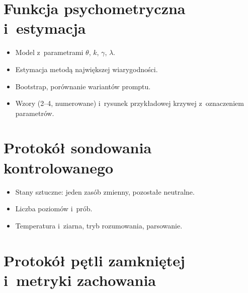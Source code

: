 \section{Funkcja psychometryczna i~estymacja}
\label{sec:4-3}

\begin{planroboczy}[ok. 2 s.]
\begin{itemize}
  \item Model z~parametrami $\theta$, $k$, $\gamma$, $\lambda$.
  \item Estymacja metodą największej wiarygodności.
  \item Bootstrap, porównanie wariantów promptu.
  \item Wzory (2–4, numerowane) i~rysunek przykładowej krzywej z~oznaczeniem parametrów.
\end{itemize}

\end{planroboczy}

\section{Protokół sondowania kontrolowanego}
\label{sec:4-4}

\begin{planroboczy}[ok. 1 s.]
\begin{itemize}
  \item Stany sztuczne: jeden zasób zmienny, pozostałe neutralne.
  \item Liczba poziomów i~prób.
  \item Temperatura i~ziarna, tryb rozumowania, parsowanie.
\end{itemize}

\end{planroboczy}

\section{Protokół pętli zamkniętej i~metryki zachowania}
\label{sec:4-5}

